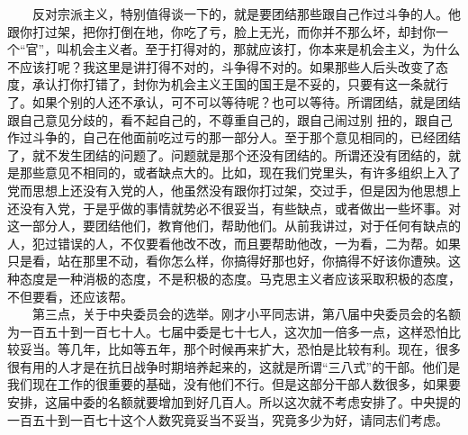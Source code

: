 \documentclass[cn,11pt,chinese]{elegantbook}
\begin{document}
　　反对宗派主义，特别值得谈一下的，就是要团结那些跟自己作过斗争的人。他跟你打过架，把你打倒在地，你吃了亏，脸上无光，而你并不那么坏，却封你一个“官”，叫机会主义者。至于打得对的，那就应该打，你本来是机会主义，为什么不应该打呢？我这里是讲打得不对的，斗争得不对的。如果那些人后头改变了态度，承认打你打错了，封你为机会主义王国的国王是不妥的，只要有这一条就行了。如果个别的人还不承认，可不可以等待呢？也可以等待。所谓团结，就是团结跟自己意见分歧的，看不起自己的，不尊重自己的，跟自己闹过别 扭的，跟自己作过斗争的，自己在他面前吃过亏的那一部分人。至于那个意见相同的，已经团结了，就不发生团结的问题了。问题就是那个还没有团结的。所谓还没有团结的，就是那些意见不相同的，或者缺点大的。比如，现在我们党里头，有许多组织上入了党而思想上还没有入党的人，他虽然没有跟你打过架，交过手，但是因为他思想上还没有入党，于是乎做的事情就势必不很妥当，有些缺点，或者做出一些坏事。对这一部分人，要团结他们，教育他们，帮助他们。从前我讲过，对于任何有缺点的人，犯过错误的人，不仅要看他改不改，而且要帮助他改，一为看，二为帮。如果只是看，站在那里不动，看你怎么样，你搞得好那也好，你搞得不好该你遭殃。这种态度是一种消极的态度，不是积极的态度。马克思主义者应该采取积极的态度，不但要看，还应该帮。\\
　　第三点，关于中央委员会的选举。刚才小平同志讲，第八届中央委员会的名额为一百五十到一百七十人。七届中委是七十七人，这次加一倍多一点，这样恐怕比较妥当。等几年，比如等五年，那个时候再来扩大，恐怕是比较有利。现在，很多很有用的人才是在抗日战争时期培养起来的，这就是所谓“三八式”的干部。他们是我们现在工作的很重要的基础，没有他们不行。但是这部分干部人数很多，如果要安排，这届中委的名额就要增加到好几百人。所以这次就不考虑安排了。中央提的一百五十到一百七十这个人数究竟妥当不妥当，究竟多少为好，请同志们考虑。\\
\end{document}
